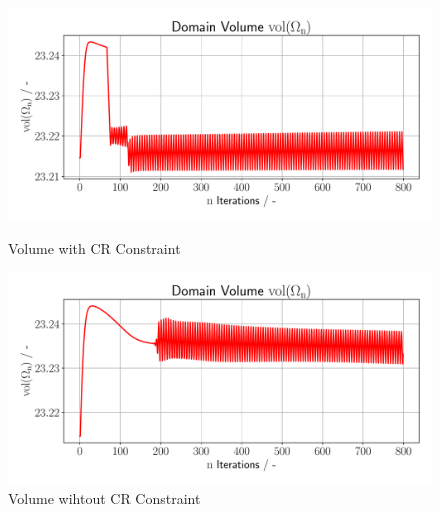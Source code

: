 \begin{figure}[h]
    \begin{minipage}{.5\textwidth}
        \centering
        \includegraphics[width=1\textwidth]{figures/volume_plot.pdf}
        \caption{Volume with CR Constraint}
        \label{plot_ref_vol_good}
    \end{minipage}
    \begin{minipage}{.5\textwidth}
        \centering
        \includegraphics[width=1\textwidth]{figures/volume_plot_bad.pdf}
        \caption{Volume wihtout CR Constraint}
        \label{plot_ref_vol_bad}
    \end{minipage}
\end{figure}


\pagebreak